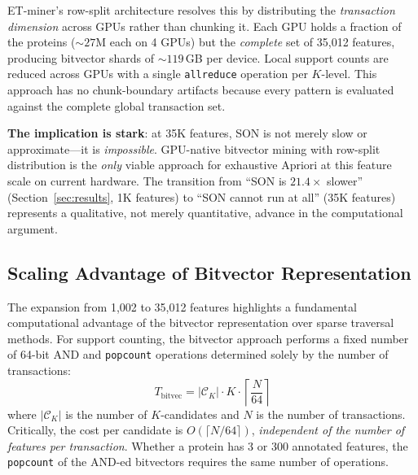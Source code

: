 ET-miner's row-split architecture resolves this by distributing the
\emph{transaction dimension} across GPUs rather than chunking it. Each GPU
holds a fraction of the proteins (${\sim}27$M each on 4 GPUs) but the
\emph{complete} set of 35,012 features, producing bitvector shards of
${\sim}119$\,GB per device. Local support counts are reduced across GPUs
with a single \texttt{allreduce} operation per $K$-level. This approach has
no chunk-boundary artifacts because every pattern is evaluated against the
complete global transaction set.

\textbf{The implication is stark}: at 35K features, SON is not merely slow or
approximate---it is \emph{impossible}. GPU-native bitvector mining with
row-split distribution is the \emph{only} viable approach for exhaustive
Apriori at this feature scale on current hardware. The transition from ``SON
is $21.4\times$ slower'' (Section~\ref{sec:results}, 1K features) to ``SON
cannot run at all'' (35K features) represents a qualitative, not merely
quantitative, advance in the computational argument.


%

\subsection{Scaling Advantage of Bitvector Representation}

The expansion from 1,002 to 35,012 features highlights a fundamental
computational advantage of the bitvector representation over sparse traversal
methods. For support counting, the bitvector approach performs a fixed number
of 64-bit AND and \texttt{popcount} operations determined solely by the number
of transactions:
%
\begin{equation}
    T_{\text{bitvec}} = |\mathcal{C}_K| \cdot K \cdot \left\lceil \frac{N}{64} \right\rceil
    \label{eq:bitvec-complexity}
\end{equation}
%
where $|\mathcal{C}_K|$ is the number of $K$-candidates and $N$ is the number
of transactions. Critically, the cost per candidate is
$O(\lceil N/64 \rceil)$, \emph{independent of the number of features per
transaction}. Whether a protein has 3 or 300 annotated features, the
\texttt{popcount} of the AND-ed bitvectors requires the same number of
operations.

